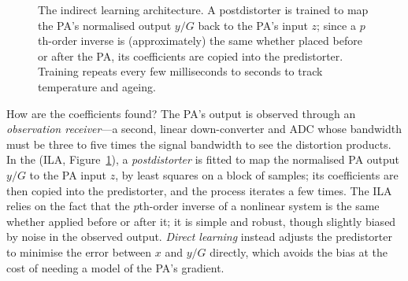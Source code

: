 \begin{figure}[htbp]\centering
{}
\caption{The indirect learning architecture. A postdistorter is trained to map the PA's normalised
output $y/G$ back to the PA's input $z$; since a $p$th-order inverse is (approximately) the same whether
placed before or after the PA, its coefficients are copied into the predistorter. Training repeats
every few milliseconds to seconds to track temperature and ageing.}
\label{fig:ch07_ila}
\end{figure}

How are the coefficients found? The PA's output is observed through an \emph{observation receiver}---a
second, linear down-converter and ADC whose bandwidth must be three to five times the signal bandwidth to
see the distortion products. In the  (ILA,
Figure~\ref{fig:ch07_ila}), a \emph{postdistorter} is fitted to map the normalised PA output $y/G$ to the
PA input $z$, by least squares on a block of samples; its coefficients are then copied into the
predistorter, and the process iterates a few times. The ILA relies on the fact that the $p$th-order
inverse of a nonlinear system is the same whether applied before or after it; it is simple and robust,
though slightly biased by noise in the observed output. \emph{Direct learning} instead adjusts the
predistorter to minimise the error between $x$ and $y/G$ directly, which avoids the bias at the cost of
needing a model of the PA's gradient.


